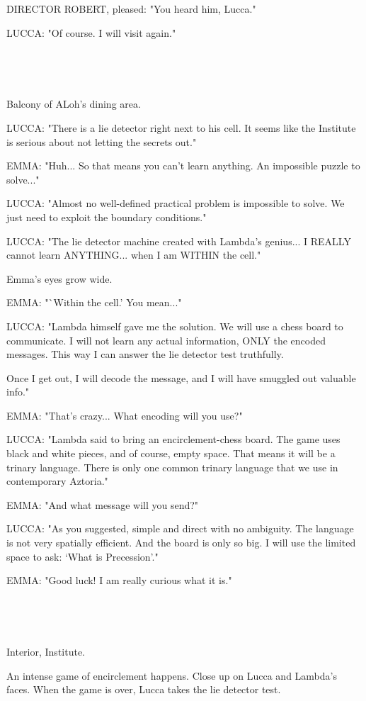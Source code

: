 \documentclass[11pt]{article}
\begin{document}
DIRECTOR ROBERT, pleased: "You heard him, Lucca."

LUCCA: "Of course. I will visit again."

\ 

\ 

Balcony of ALoh's dining area.

LUCCA: "There is a lie detector right next to his cell. 
It seems like the Institute is serious about not letting the secrets out."

EMMA: "Huh... So that means you can't learn anything.
An impossible puzzle to solve..."

LUCCA: "Almost no well-defined practical problem is impossible to solve.
We just need to exploit the boundary conditions."

LUCCA: "The lie detector machine created with Lambda's genius... 
I REALLY cannot learn ANYTHING... when I am WITHIN the cell."

Emma's eyes grow wide.

EMMA: "`Within the cell.' You mean..."

LUCCA: "Lambda himself gave me the solution.
We will use a chess board to communicate.
I will not learn any actual information, ONLY the encoded messages.
This way I can answer the lie detector test truthfully.

Once I get out, I will decode the message, and I will have smuggled out valuable info."

EMMA: "That's crazy...
What encoding will you use?"

LUCCA: "Lambda said to bring an encirclement-chess board.
The game uses black and white pieces, and of course, empty space.
That means it will be a trinary language.
There is only one common trinary language that we use in contemporary Aztoria."

EMMA: "And what message will you send?"

LUCCA: "As you suggested, simple and direct with no ambiguity.
The language is not very spatially efficient.
And the board is only so big.
I will use the limited space to ask:
`What is Precession'."

EMMA: "Good luck! I am really curious what it is."

\ 

\ 

Interior, Institute. 

An intense game of encirclement happens.
Close up on Lucca and Lambda's faces.
When the game is over, Lucca takes the lie detector test.
\end{document}
